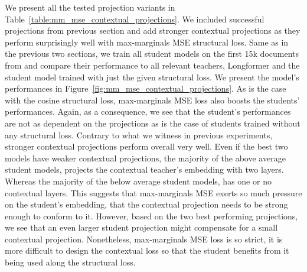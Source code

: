 We present all the tested projection variants in
Table~\ref{table:mm_mse_contextual_projections}. We included successful
projections from previous section and add stronger contextual projections as
they perform surprisingly well with max-marginals MSE structural loss. Same as
in the previous two sections, we train all student models on the first 15k
documents from  and compare their performance to all
relevant teachers, Longformer and the student model trained with just the given
structural loss. We present the model's performances in
Figure~\ref{fig:mm_mse_contextual_projections}. As is the case with the cosine
structural loss, max-marginals MSE loss also boosts the students' performances.
Again, as a consequence, we see that the student's performances are not as
dependent on the projections as is the case of students trained without any
structural loss. Contrary to what we witness in previous experiments, stronger
contextual projections perform overall very well. Even if the best two models
have weaker contextual projections, the majority of the above average student
models, projects the contextual teacher's embedding with two layers. Whereas
the majority of the below average student models, has one or no contextual
layers. This suggests that max-marginals MSE exerts so much pressure on the
student's embedding, that the contextual projection needs to be strong enough
to conform to it. However, based on the two best performing projections, we see
that an even larger student projection might compensate for a small contextual
projection. Nonetheless, max-marginals MSE loss is so strict, it is more
difficult to design the contextual loss so that the student benefits from it
being used along the structural loss.

